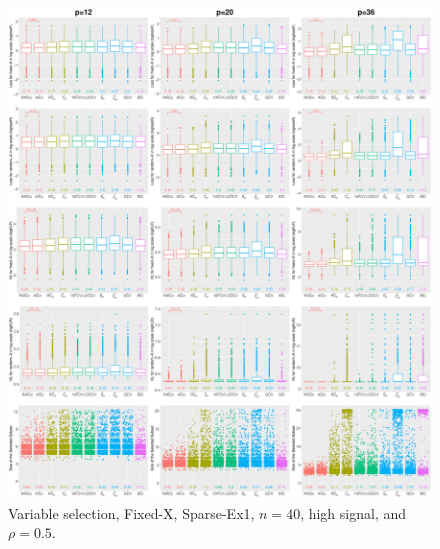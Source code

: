\begin{figure}[!ht]
\centering
\includegraphics[width=\textwidth]{figures/supplement/fixedx/subset_selection/Sparse-Ex1_n40_hsnr_rho05.eps}
\caption{Variable selection, Fixed-X, Sparse-Ex1, $n=40$, high signal, and $\rho=0.5$.}
\end{figure}
\clearpage
